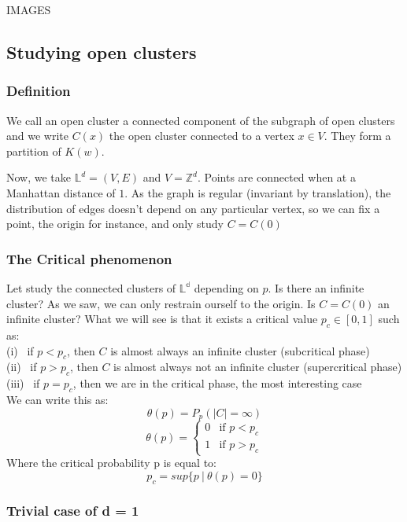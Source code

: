 \documentclass{article}
\begin{document}
IMAGES

\subsection{Studying open clusters}
\subsubsection{Definition}
We call an open cluster a connected component of the subgraph of open clusters and we write $C(x)$ the open cluster connected to a vertex $x \in V$. They form a partition of $K(w)$.

Now, we take $\mathbb{L}^d=(V,E)$ and $V=\mathbb{Z}^d$. Points are connected when at a Manhattan distance of $1$.
As the graph is regular (invariant by translation), the distribution of edges doesn't depend on any particular vertex, so we can fix a point, the origin for instance, and only study $C=C(0)$

\subsubsection{The Critical phenomenon}
Let study the connected clusters of $\mathbb{L^d}$ depending on $p$. Is there an infinite cluster?
As we saw, we can only restrain ourself to the origin. Is $C = C(0)$ an infinite cluster?
What we will see is that it exists a critical value $p_c\in [0,1]$ such as: \\

(i) \ if $p < p_c$, then $C$ is almost always an infinite cluster (subcritical phase) \\
(ii) \ if $p > p_c$, then $C$ is almost always not an infinite cluster (supercritical phase) \\
(iii) \ if $p = p_c$, then we are in the critical phase, the most interesting case \\

We can write this as: \\
$$\theta(p) = P_p(|C|=\infty)$$
$$
\theta(p) = \left\{
    \begin{array}{ll}
        0 & \mbox{if $p < p_c$}\\
        1 & \mbox{if $p > p_c$}
    \end{array}
\right.
$$
Where the critical probability p is equal to:
$$p_c = sup\{p \ | \ \theta(p)=0\}$$

\subsubsection{Trivial case of d = 1}
\end{document}
